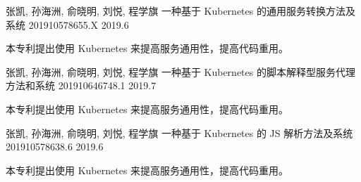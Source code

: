 
\begin{cventries}


  \cventry
    {张凯, 孙海洲, 俞晓明, 刘悦, 程学旗} %
    {一种基于 Kubernetes 的通用服务转换方法及系统} %
    {201910578655.X} %
    {2019.6} %
    {
      \begin{cvitems} %
        \item {
          本专利提出使用 Kubernetes 来提高服务通用性，提高代码重用。
        }
      \end{cvitems}
    }

\cventry
{张凯, 孙海洲, 俞晓明, 刘悦, 程学旗} %
{一种基于 Kubernetes 的脚本解释型服务代理方法和系统} %
{201910646748.1} %
{2019.7} %
{
  \begin{cvitems} %
    \item {
      本专利提出使用 Kubernetes 来提高服务通用性，提高代码重用。
    }
  \end{cvitems}
}

\cventry
{张凯, 孙海洲, 俞晓明, 刘悦, 程学旗} %
{一种基于 Kubernetes 的 JS 解析方法及系统} %
{201910578638.6} %
{2019.6} %
{
  \begin{cvitems} %
    \item {
      本专利提出使用 Kubernetes 来提高服务通用性，提高代码重用。
    }
  \end{cvitems}
}

\end{cventries}
